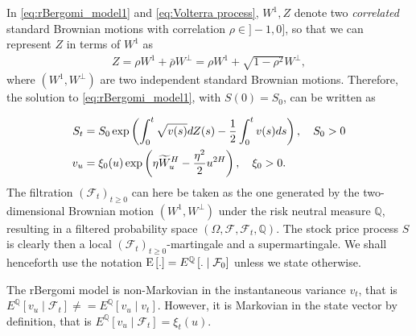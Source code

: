 %
In \eqref{eq:rBergomi_model1} and \eqref{eq:Volterra process}, $W^1, Z$ denote two \emph{correlated} standard Brownian motions with correlation $\rho \in ]-1,0]$, so that we can represent $Z$ in terms of $W^1$ as
\begin{align*}
	Z=\rho	W^1+ \bar{\rho}W^\perp = \rho W^1+\sqrt{1-\rho^2} W^\perp,
\end{align*}
where $(W^1,W^\perp)$ are two independent standard Brownian motions.
Therefore, the solution to \eqref{eq:rBergomi_model1}, with $S(0)=S_0$, can be written as 

\begin{align}\label{eq:rBergomi_model}
	S_t&= S_0  \operatorname{exp}\left( \int_{0}^{t} \sqrt{v(s)} dZ(s)- \frac{1}{2} \int_{0}^{t} v(s) ds   \right),\quad S_0>0 \nonumber\\
	v_u&=\xi_0(u) \operatorname{exp}\left( \eta \widetilde{W}_u^H- \frac{\eta^2}{2} u^{2H} \right), \quad \xi_0>0 .
\end{align}
The filtration $(\mathcal{F}_t)_{t\ge 0}$ can here be taken as the one generated by the two-dimensional Brownian motion $(W^1,W^\perp)$ under the risk neutral measure $\mathbb{Q}$, resulting in  a filtered probability space $(\Omega,\mathcal{F}, \mathcal{F}_t,\mathbb{Q})$. The stock price process $S$ is clearly then a local
$(\mathcal{F}_t)_{t\ge 0}$-martingale and a supermartingale.  We shall henceforth use the notation $\mathrm{E}\left[.\right] = E^{\mathbb{Q}}\left[. \mid \mathcal{F}_0\right]$ unless we state otherwise.
\begin{remark}
The rBergomi model is non-Markovian in the instantaneous variance $v_t$, that is $E^{\mathbb{Q}}\left[v_u\mid \mathcal{F}_t\right] \neq= E^{\mathbb{Q}}\left[v_u\mid v_t\right]$. However, it is Markovian in the state vector by definition, that is $E^{\mathbb{Q}}\left[v_u\mid\mathcal{F}_t\right]=\xi_t(u)$.
\end{remark}

